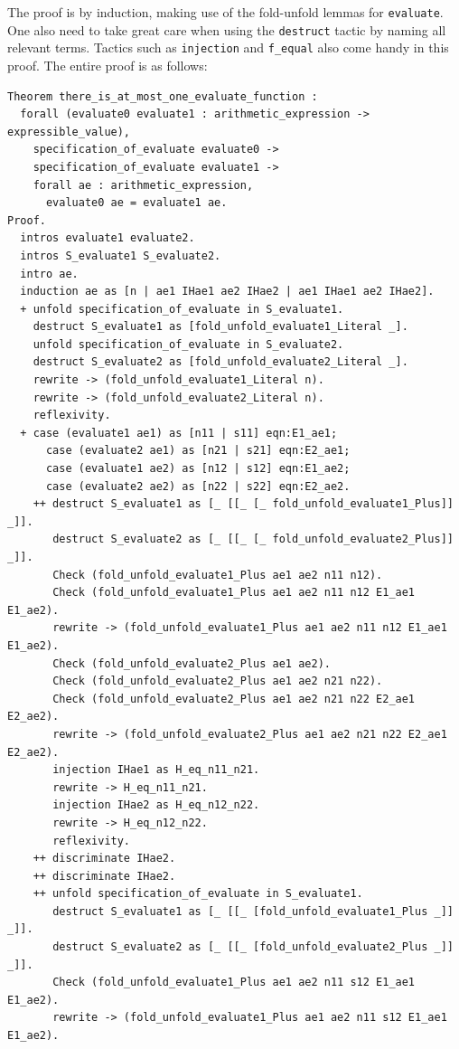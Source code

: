 \documentclass{article}
\begin{document}
The proof is by induction, making use of the fold-unfold lemmas for \texttt{evaluate}. One also need to take great care when using the \texttt{destruct} tactic by naming all relevant terms. Tactics such as \texttt{injection} and \texttt{f\_equal} also come handy in this proof. The entire proof is as follows:

\begin{lstlisting}
Theorem there_is_at_most_one_evaluate_function :
  forall (evaluate0 evaluate1 : arithmetic_expression -> expressible_value),
    specification_of_evaluate evaluate0 ->
    specification_of_evaluate evaluate1 ->
    forall ae : arithmetic_expression,
      evaluate0 ae = evaluate1 ae.
Proof.
  intros evaluate1 evaluate2.
  intros S_evaluate1 S_evaluate2.
  intro ae.
  induction ae as [n | ae1 IHae1 ae2 IHae2 | ae1 IHae1 ae2 IHae2].
  + unfold specification_of_evaluate in S_evaluate1.
    destruct S_evaluate1 as [fold_unfold_evaluate1_Literal _].
    unfold specification_of_evaluate in S_evaluate2.
    destruct S_evaluate2 as [fold_unfold_evaluate2_Literal _].
    rewrite -> (fold_unfold_evaluate1_Literal n).
    rewrite -> (fold_unfold_evaluate2_Literal n).
    reflexivity.
  + case (evaluate1 ae1) as [n11 | s11] eqn:E1_ae1;
      case (evaluate2 ae1) as [n21 | s21] eqn:E2_ae1;
      case (evaluate1 ae2) as [n12 | s12] eqn:E1_ae2;
      case (evaluate2 ae2) as [n22 | s22] eqn:E2_ae2.
    ++ destruct S_evaluate1 as [_ [[_ [_ fold_unfold_evaluate1_Plus]] _]].
       destruct S_evaluate2 as [_ [[_ [_ fold_unfold_evaluate2_Plus]] _]].
       Check (fold_unfold_evaluate1_Plus ae1 ae2 n11 n12).
       Check (fold_unfold_evaluate1_Plus ae1 ae2 n11 n12 E1_ae1 E1_ae2).
       rewrite -> (fold_unfold_evaluate1_Plus ae1 ae2 n11 n12 E1_ae1 E1_ae2).
       Check (fold_unfold_evaluate2_Plus ae1 ae2).
       Check (fold_unfold_evaluate2_Plus ae1 ae2 n21 n22).
       Check (fold_unfold_evaluate2_Plus ae1 ae2 n21 n22 E2_ae1 E2_ae2).
       rewrite -> (fold_unfold_evaluate2_Plus ae1 ae2 n21 n22 E2_ae1 E2_ae2).
       injection IHae1 as H_eq_n11_n21.
       rewrite -> H_eq_n11_n21.
       injection IHae2 as H_eq_n12_n22.
       rewrite -> H_eq_n12_n22.
       reflexivity.
    ++ discriminate IHae2.
    ++ discriminate IHae2.
    ++ unfold specification_of_evaluate in S_evaluate1.
       destruct S_evaluate1 as [_ [[_ [fold_unfold_evaluate1_Plus _]] _]].
       destruct S_evaluate2 as [_ [[_ [fold_unfold_evaluate2_Plus _]] _]].
       Check (fold_unfold_evaluate1_Plus ae1 ae2 n11 s12 E1_ae1 E1_ae2).
       rewrite -> (fold_unfold_evaluate1_Plus ae1 ae2 n11 s12 E1_ae1 E1_ae2).

\end{lstlisting}
\end{document}

